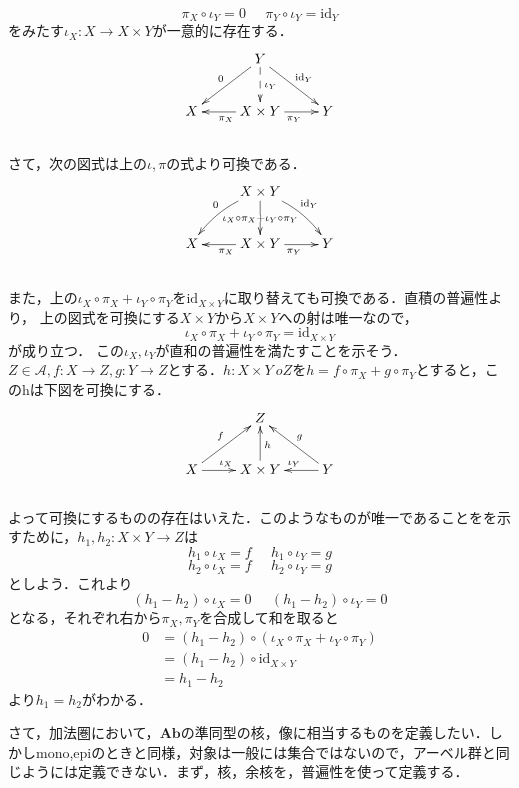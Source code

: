 \[
\pi_X \circ \iota_Y = 0\;\;\;\;\;\pi_Y \circ \iota_Y = \mathrm{id}_Y
\]
をみたす$\iota_X : X \to X\times Y$が一意的に存在する．
\[
\xymatrix{
	& \ar[dl]_0 Y  \ar@{-->}[d]^{\iota_Y}  \ar[dr]^{\mathrm{id}_Y}	& \\
X 	& \ar[l]^{\pi_X} X \times Y \ar[r]_{\pi_Y} 	& Y 
}
\]
\\
さて，次の図式は上の$\iota,\pi$の式より可換である．
\[
\xymatrix{
	& \ar@/_/[dl]_0 X \times Y  \ar[d] | {\iota_X \circ \pi_X + \iota_Y \circ \pi_Y}  \ar@/^/[dr]^{\mathrm{id}_Y}	& \\
X 	& \ar[l]^{\pi_X} X \times Y \ar[r]_{\pi_Y} 	& Y 
}
\]
\\
また，上の$\iota_X \circ \pi_X + \iota_Y \circ \pi_Y$を$\mathrm{id}_{X \times Y}$に取り替えても可換である．直積の普遍性より，
上の図式を可換にする$X \times Y$から$X \times Y$への射は唯一なので，
\[
\iota_X \circ \pi_X + \iota_Y \circ \pi_Y = \mathrm{id}_{X \times Y}
\]
が成り立つ．
この$\iota_X,\iota_Y$が直和の普遍性を満たすことを示そう．\\
$Z\in \mathcal{A},f:X \to Z, g:Y \to Z$とする．$h : X \times Y \ o Z $を$h = f \circ \pi_X + g \circ \pi_Y$とすると，このhは下図を可換にする．
\[
\xymatrix{
& \ar@{<-}[dl]_f Z  \ar@{<-}[d]^{h}  \ar@{<-}[dr]^{g}  \\
X \ar[r]^{\iota_X} &  X \times Y & 	\ar[l]_{\iota_Y}  Y 
}
\]
\\
よって可換にするものの存在はいえた．このようなものが唯一であることをを示すために，$h_1,h_2: X \times Y \to Z $は
\[
h_1 \circ \iota_X = f \;\;\;\;\; h_1 \circ \iota_Y = g 
\]\[
h_2 \circ \iota_X = f \;\;\;\;\; h_2 \circ \iota_Y = g
\]
としよう．これより
\[
(h_1-h_2)\circ \iota_X = 0\;\;\;\;\;(h_1-h_2)\circ \iota_Y = 0
\]
となる，それぞれ右から$\pi_X,\pi_Y$を合成して和を取ると
\begin{align*}
0	&= (h_1 - h_2)\circ (\iota_X \circ \pi_X + \iota_Y \circ \pi_Y) \\
	&= (h_1 - h_2)\circ \mathrm{id}_{X \times Y} \\
	&= h_1 - h_2 
\end{align*}
より$h_1 = h_2$がわかる．
\proofend

さて，加法圏において，$\mathbf{Ab}$の準同型の核，像に相当するものを定義したい．しかしmono,epiのときと同様，対象は一般には集合ではないので，アーベル群と同じようには定義できない．まず，核，余核を，普遍性を使って定義する．

